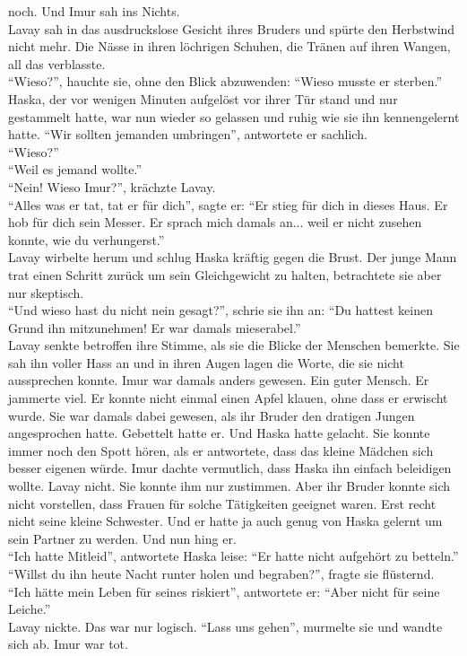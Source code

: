 noch. Und Imur sah ins Nichts.\\
Lavay sah in das ausdruckslose Gesicht ihres Bruders und spürte den Herbstwind nicht mehr. Die 
Nässe in ihren löchrigen Schuhen, die Tränen auf ihren Wangen, all das verblasste. \\
``Wieso?'', hauchte sie, ohne den Blick abzuwenden: ``Wieso musste er sterben.''\\
Haska, der vor wenigen Minuten aufgelöst vor ihrer Tür stand und nur gestammelt hatte, war nun 
wieder so gelassen und ruhig wie sie ihn kennengelernt hatte. ``Wir sollten jemanden umbringen'', 
antwortete er sachlich.\\
``Wieso?''\\
``Weil es jemand wollte.''\\
``Nein! Wieso Imur?'', krächzte Lavay.\\
``Alles was er tat, tat er für dich'', sagte er: ``Er stieg für dich in dieses Haus. Er hob für 
dich sein Messer. Er sprach mich damals an... weil er nicht zusehen konnte, wie du verhungerst.''\\
Lavay wirbelte herum und schlug Haska kräftig gegen die Brust. Der junge Mann trat einen Schritt 
zurück um sein Gleichgewicht zu halten, betrachtete sie aber nur skeptisch. \\
``Und wieso hast du nicht nein gesagt?'', schrie sie ihn an: ``Du hattest keinen Grund ihn 
mitzunehmen! Er war damals mieserabel.''\\
Lavay senkte betroffen ihre Stimme, als sie die Blicke der Menschen bemerkte. Sie sah ihn voller 
Hass an und in ihren Augen lagen die Worte, die sie nicht aussprechen konnte. Imur war damals 
anders gewesen. Ein guter Mensch. Er jammerte viel. Er konnte nicht einmal einen Apfel klauen, ohne 
dass er erwischt wurde. Sie war damals dabei gewesen, als ihr Bruder den dratigen Jungen 
angesprochen hatte. Gebettelt hatte er. Und Haska hatte gelacht. Sie konnte immer noch den Spott 
hören, als er antwortete, dass das kleine Mädchen sich besser eigenen würde. Imur dachte vermutlich, 
dass Haska ihn einfach beleidigen wollte. Lavay nicht. Sie konnte ihm nur zustimmen. Aber ihr Bruder 
konnte sich nicht vorstellen, dass Frauen für solche Tätigkeiten geeignet waren. Erst recht nicht 
seine kleine Schwester. Und er hatte ja auch genug von Haska gelernt um sein Partner zu werden. Und 
nun hing er. \\
``Ich hatte Mitleid'', antwortete Haska leise: ``Er hatte nicht aufgehört zu betteln.''\\
``Willst du ihn heute Nacht runter holen und begraben?'', fragte sie flüsternd.\\
``Ich hätte mein Leben für seines riskiert'', antwortete er: ``Aber nicht für seine Leiche.''\\
Lavay nickte. Das war nur logisch. ``Lass uns gehen'', murmelte sie und wandte sich ab. Imur war 
tot. \\

